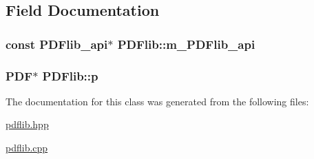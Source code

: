 \subsection{Field Documentation}
\hypertarget{classPDFlib_a65d13899e72570340d47e3766a8d8e92}{
\subsubsection[{m\+\_\+\+P\+D\+Flib\+\_\+api}]{\setlength{\rightskip}{0pt plus 5cm}const P\+D\+Flib\+\_\+api$\ast$ P\+D\+Flib\+::m\+\_\+\+P\+D\+Flib\+\_\+api\hspace{0.3cm}{\ttfamily [private]}}}\label{classPDFlib_a65d13899e72570340d47e3766a8d8e92}
\hypertarget{classPDFlib_a9ea3cf3bfba7ad4727622bf31ef632cb}{
\subsubsection[{p}]{\setlength{\rightskip}{0pt plus 5cm}P\+D\+F$\ast$ P\+D\+Flib\+::p\hspace{0.3cm}{\ttfamily [private]}}}\label{classPDFlib_a9ea3cf3bfba7ad4727622bf31ef632cb}


The documentation for this class was generated from the following files\+:\begin{DoxyCompactItemize}
\item 
\hyperlink{pdflib_8hpp}{pdflib.\+hpp}\item 
\hyperlink{pdflib_8cpp}{pdflib.\+cpp}\end{DoxyCompactItemize}
